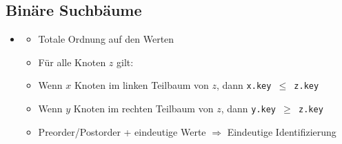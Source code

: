 \documentclass[
    12pt,
    a4paper,
    ngerman,
    color=3b,%
    marginpar=false,
    colorback=false,
    leqno,
]{tudaexercise}
\begin{document}
\subsection{Binäre Suchbäume}\label{Binaere Suchbaeume}
\begin{itemize}
    \item {}
          \begin{itemize}
              \item Totale Ordnung auf den Werten
              \item Für alle Knoten $z$ gilt:
              \item[] Wenn $x$ Knoten im linken Teilbaum von $z$, dann \texttt{x.key $\leq$ z.key}
              \item[] Wenn $y$ Knoten im rechten Teilbaum von $z$, dann \texttt{y.key $\geq$ z.key}
              \item Preorder/Postorder + eindeutige Werte $\Rightarrow$ Eindeutige Identifizierung
          \end{itemize}


\end{itemize}
\end{document}
